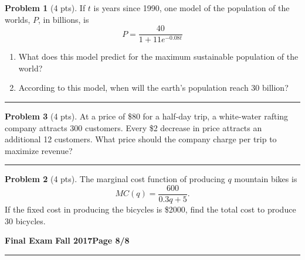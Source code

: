 \documentclass[12pt]{article}
\theoremstyle{definition}
\newtheorem{problem}{Problem}
\begin{document}
\bigskip

\begin{problem}[4 pts]
If $t$ is years since 1990, one model of the population of the worlds, $P$, in billions, is
\begin{equation*} P = \frac{40}{1+11e^{-0.08t}} \end{equation*}
\begin{enumerate}
  \item What does this model predict for the maximum sustainable population of the world?
  \vspace{1cm}
  \item According to this model, when will the earth's population reach 30 billion?
\end{enumerate}

\vspace{1cm}
\end{problem}
\hrule

\begin{problem}[4 pts]
At a price of \$80 for a half-day trip, a white-water rafting company attracts 300 customers.  Every \$2 decrease in price attracts an additional 12 customers.  What price should the company charge per trip to maximize revenue?
\vspace{7cm}
\hrule

\begin{problem}[4 pts]
The marginal cost function of producing $q$ mountain bikes is 
\begin{equation*}
MC(q) = \frac{600}{0.3q+5}.
\end{equation*}
If the fixed cost in producing the bicycles is \$2000, find the total cost to produce 30 bicycles.
\end{problem}

\end{problem}

\newpage

\hfill{\large\bf Final Exam}\hfill{\large\bf
  Fall 2017}\hfill{\large\bf Page 8/8}\hrule
\end{document}
